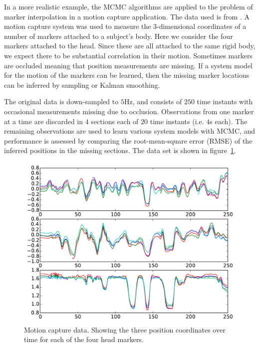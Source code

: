 \documentclass[journal,10pt]{IEEEtran}
\begin{document}
In a more realistic example, the MCMC algorithms are applied to the problem of marker interpolation in a motion capture application. The data used is from \cite{Aristidou2013}. A motion capture system was used to measure the $3$-dimensional coordinates of a number of markers attached to a subject's body. Here we consider the four markers attached to the head. Since these are all attached to the same rigid body, we expect there to be substantial correlation in their motion. Sometimes markers are occluded meaning that position measurements are missing. If a system model for the motion of the markers can be learned, then the missing marker locations can be inferred by sampling or Kalman smoothing.

The original data is down-sampled to $5$Hz, and consists of $250$ time instants with occasional measurements missing due to occlusion. Observations from one marker at a time are discarded in $4$ sections each of $20$ time instants (i.e. $4$s each). The remaining observations are used to learn various system models with MCMC, and performance is assessed by comparing the root-mean-square error (RMSE) of the inferred positions in the missing sections. The data set is shown in figure~\ref{fig:mocap_data}.

\begin{figure}
 \centering
 \includegraphics[width=0.9\columnwidth]{figures/mocap-data.pdf}
 \caption{Motion capture data. Showing the three position coordinates over time for each of the four head markers.}
 \label{fig:mocap_data}
\end{figure}
\end{document}
